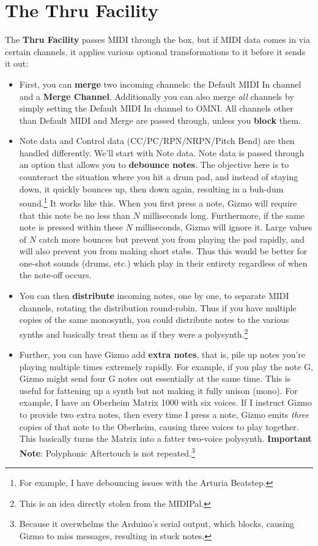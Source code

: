 \documentclass{article}
\begin{document}
\section{The Thru Facility}
\label{thru}

The {\bf Thru Facility} passes MIDI through the box, but if MIDI data comes in via certain channels, it applies various optional transformations to it before it sends it out:

\begin{itemize}
\item First, you can {\bf merge} two incoming channels: the Default MIDI In channel and a {\bf Merge Channel}.  Additionally you can also merge {\it all} channels by simply setting the Default MIDI In channel to OMNI.  All channels other than Default MIDI and Merge are passed through, unless you {\bf block} them.

\item Note data and Control data (CC/PC/RPN/NRPN/Pitch Bend) are then handled differently. We'll start with Note data.   Note data is passed through an option that allows you to {\bf debounce notes}.   The objective here is to counteract the situation where you hit a drum pad, and instead of staying down, it quickly bounces up, then down again, resulting in a buh-dum sound.\footnote{For example, I have debouncing issues with the Arturia Beatstep.}  It works like this.  When you first press a note, Gizmo will require that this note be no less than \(N\) milliseconds long.  Furthermore, if the same note is pressed within these \(N\) milliseconds, Gizmo will ignore it.     Large values of \(N\) catch more bounces but prevent you from playing the pad rapidly, and will also prevent you from making short stabs.  Thus this would be better for one-shot sounds (drums, etc.) which play in their entirety regardless of when the note-off occurs.

\item You can then {\bf distribute} incoming notes, one by one, to separate MIDI channels, rotating the distribution round-robin.  Thus if you have multiple copies of the same monosynth, you could distribute notes to the various synths and basically treat them as if they were a polysynth.\footnote{This is an idea directly stolen from the MIDIPal.}

\item Further, you can have Gizmo add {\bf extra notes}, that is, pile up notes you're playing multiple times extremely rapidly.  For example, if you play the note G, Gizmo might send four G notes out essentially at the same time.  This is useful for fattening up a synth but not making it fully unison (mono).  For example, I have an Oberheim Matrix 1000 with six voices.  If I instruct Gizmo to provide two extra notes, then every time I press a note, Gizmo emits {\it three} copies of that note to the Oberheim, causing three voices to play together.  This basically turns the Matrix into a fatter two-voice polysynth.  {\bf Important Note}: Polyphonic Aftertouch is not repeated.\footnote{\label{serialbuffer}Because it overwhelms the Arduino's serial output, which blocks, causing Gizmo to miss messages, resulting in stuck notes.}


\end{itemize}
\end{document}
